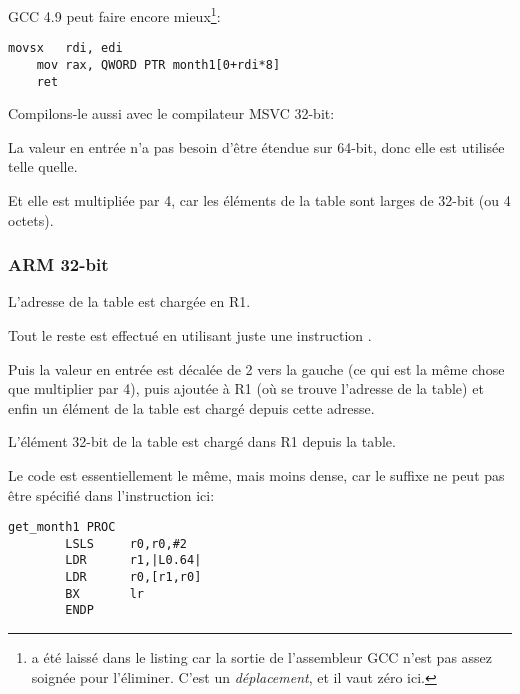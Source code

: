GCC 4.9 \Optimizing peut faire encore mieux\footnote{ a été laissé dans le
listing car la sortie de l'assembleur GCC n'est pas assez soignée pour l'éliminer.
C'est un \emph{déplacement}, et il vaut zéro ici.}:

\begin{lstlisting}[caption=GCC 4.9 \Optimizing x64,style=customasmx86]
	movsx	rdi, edi
	mov	rax, QWORD PTR month1[0+rdi*8]
	ret
\end{lstlisting}


Compilons-le aussi avec le compilateur MSVC 32-bit:



La valeur en entrée n'a pas besoin  d'être étendue sur 64-bit, donc elle est utilisée
telle quelle.

Et elle est multipliée par 4, car les éléments de la table sont larges de 32-bit
(ou 4 octets).

\subsubsection{ARM 32-bit}





L'adresse de la table est chargée en R1.

Tout le reste est effectué en utilisant juste une instruction \LDR.

Puis la valeur en entrée est décalée de 2 vers la gauche (ce qui est la même chose
que multiplier par 4), puis ajoutée à R1 (où se trouve l'adresse de la table) et
enfin un élément de la table est chargé depuis cette adresse.

L'élément 32-bit de la table est chargé dans R1 depuis la table.


Le code est essentiellement le même, mais moins dense, car le suffixe \LSL ne peut
pas être spécifié dans l'instruction \LDR ici:

\begin{lstlisting}[style=customasmARM]
get_month1 PROC
        LSLS     r0,r0,#2
        LDR      r1,|L0.64|
        LDR      r0,[r1,r0]
        BX       lr
        ENDP
\end{lstlisting}

